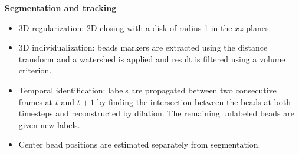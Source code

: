 \documentclass[final,svgnames,dvipsnames,table]{beamer}
\begin{document}
\begin{frame}[fragile]
\begin{columns}[t,totalwidth=\textwidth]
\begin{column}{0.32\textwidth}
\begin{block}{\bf Segmentation and tracking}
\begin{itemize}
\begin{figure}
\caption{Illustration of the segmentation procedure: (a) initial image, (b) result of the segmentation described in the text,  (c) overlay of the segmentation on the initial image.}
\label{fig:seg1}
\end{figure}
\vspace{1.2em}
        \item 3D regularization: 2D closing with a disk of radius 1 in the $xz$ planes.
        \item 3D individualization: beads markers are extracted using the distance transform and a watershed is applied and result is filtered using a volume criterion.
        \item Temporal identification: labels are propagated between
          two consecutive frames at $t$ and $t+1$ by finding the
          intersection between the beads at both timesteps and
          reconstructed by dilation. The remaining unlabeled beads are
          given new labels.
          \item Center bead positions are estimated separately from segmentation.
      \end{itemize}
     


\end{block}
\end{column}
\end{columns}
\end{frame}
\end{document}
